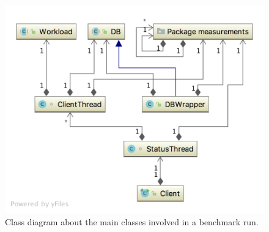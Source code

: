 \begin{figure}
  \centering
  \includegraphics[width=\textwidth]{images/basicYCSBWorkflow}
  \caption{Class diagram about the main classes involved in a benchmark run.}
  \label{fig:basicYCSBWorkflow}
\end{figure}
